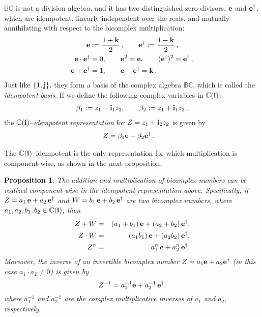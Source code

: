 \documentclass[reqno]{amsart}
\theoremstyle{plain}
\newtheorem{proposition}[theorem]{Proposition}
\theoremstyle{definition}
\theoremstyle{remark}
\numberwithin{equation}{section}
\begin{document}
${{\mathbb B}{\mathbb C}}$ is not a division algebra, and it has two distinguished zero
divisors, ${{\bf e}}$ and ${{\bf e^\dagger}}$, which are idempotent, linearly independent
over the reals, and mutually annihilating with respect to the
bicomplex multiplication:
\begin{align*}
  {{\bf e}}&:=\frac{1+{{\bf k}}}{2}\,,\qquad {{\bf e^\dagger}}:=\frac{1-{{\bf k}}}{2}\,,\\
  {{\bf e}} \cdot {{\bf e^\dagger}} &= 0,\qquad
  {{\bf e}}^2={{\bf e}} , \qquad ({{\bf e^\dagger}})^2 ={{\bf e^\dagger}}\,,\\
  {{\bf e}} +{{\bf e^\dagger}} &=1, \qquad {{\bf e}} -{{\bf e^\dagger}} = {{\bf k}}\,.
\end{align*}
Just like $\{1, {{\bf j}} \},$ they form a basis of the complex algebra
${{\mathbb B}{\mathbb C}}$, which is called the {\em idempotent basis}. If we define the
following complex variables in ${{\mathbb C}}({{\bf i}})$:
\begin{align*}
  \beta_1 := z_1-{{\bf i}}_1z_2,\qquad \beta_2 := z_1+{{\bf i}}_1z_2\,,
\end{align*}
the ${{\mathbb C}}({{\bf i}})$--{\em idempotent representation} for $Z=z_1+{{\bf i}}_2 z_2$ is
given by
\begin{align*}
  Z &= \beta_1{{\bf e}}+\beta_2{{\bf e^\dagger}}\,.
\end{align*}

The ${{\mathbb C}}({{\bf i}})$--idempotent is the only representation for which
multiplication is component-wise, as shown in the next proposition.

\begin{proposition}
  \label{prop:idempotent}
  The addition and multiplication of bicomplex numbers can be realized
  component-wise in the idempotent representation above. Specifically,
  if $Z= a_1\,{{\bf e}} + a_2\,{{\bf e^\dagger}}$ and $W= b_1\,{{\bf e}} + b_2\,{{\bf e^\dagger}} $ are two
  bicomplex numbers, where $a_1,a_2,b_1,b_2\in{{\mathbb C}}({{\bf i}})$, then
  \begin{eqnarray*}
    Z+W &=& (a_1+b_1)\,{{\bf e}}  + (a_2+b_2)\,{{\bf e^\dagger}}   ,  \\
    Z\cdot W &=& (a_1b_1)\,{{\bf e}}  + (a_2b_2)\,{{\bf e^\dagger}}   ,  \\
    Z^n &=& a_1^n \,{{\bf e}}  + a_2^n \,{{\bf e^\dagger}}  .
  \end{eqnarray*}
  Moreover, the inverse of an invertible bicomplex number
  $Z=a_1{{\bf e}} + a_2{{\bf e^\dagger}} $ (in this case $a_1 \cdot a_2 \neq 0$) is given
  by
  $$
  Z^{-1}= a_1^{-1}{{\bf e}} + a_2^{-1}\,{{\bf e^\dagger}} ,
  $$
  where $a_1^{-1}$ and $a_2^{-1}$ are the complex multiplicative
  inverses of $a_1$ and $a_2$, respectively.
\end{proposition}
\end{document}
